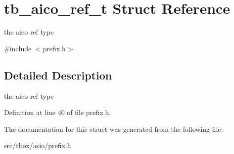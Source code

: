 \hypertarget{structtb__aico__ref__t}{\section{tb\-\_\-aico\-\_\-ref\-\_\-t Struct Reference}
\label{structtb__aico__ref__t}
}


the aico ref type  




{\ttfamily \#include $<$prefix.\-h$>$}



\subsection{Detailed Description}
the aico ref type 

Definition at line 40 of file prefix.\-h.



The documentation for this struct was generated from the following file\-:\begin{DoxyCompactItemize}
\item 
src/tbox/asio/prefix.\-h\end{DoxyCompactItemize}
